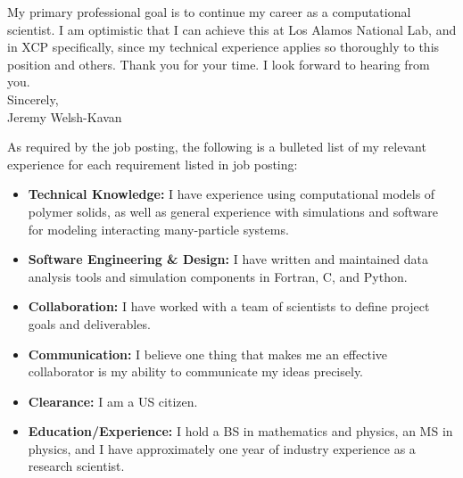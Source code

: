 \documentclass[]{letter}
\begin{document}
My primary professional goal is to continue my career as a computational scientist. I am optimistic that I can achieve this at Los Alamos National Lab, and in XCP specifically, since my technical experience applies so thoroughly to this position and others. Thank you for your time. I look forward to hearing from you. \\

Sincerely, \\
Jeremy Welsh-Kavan


\newpage


As required by the job posting, the following is a bulleted list of my relevant experience for each requirement listed in job posting:

\begin{itemize}

\item \textbf{Technical Knowledge:} I have experience using computational models of polymer solids, as well as general experience with simulations and software for modeling interacting many-particle systems. \\

\item \textbf{Software Engineering \& Design:} I have written and maintained data analysis tools and simulation components in Fortran, C, and Python. \\

\item \textbf{Collaboration:} I have worked with a team of scientists to define project goals and deliverables. \\

\item \textbf{Communication:} I believe one thing that makes me an effective collaborator is my ability to communicate my ideas precisely. \\

\item \textbf{Clearance:} I am a US citizen. \\

\item \textbf{Education/Experience:} I hold a BS in mathematics and physics, an MS in physics, and I have approximately one year of industry experience as a research scientist. \\

\end{itemize}
\end{document}
